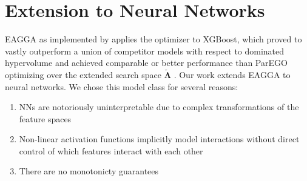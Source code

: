 \documentclass[twoside,11pt]{article}
\begin{document}
\section{Extension to Neural Networks}
EAGGA as implemented by \citet{EAGGA} applies the optimizer to XGBoost, which proved to vastly outperform a union of competitor models with respect to
dominated hypervolume and achieved comparable or better performance than ParEGO optimizing over the
extended search space $\check{\boldsymbol\Lambda}$ \citep[pp. 543-545]{EAGGA}.
Our work extends EAGGA to neural networks. We chose this model class for several reasons:
\begin{enumerate}[label*=\arabic*.]
  \item NNs are notoriously uninterpretable due to complex transformations of the feature spaces
  \item Non-linear activation functions implicitly model interactions without direct control of which features interact with each other
  \item There are no monotonicty guarantees
\end{enumerate}
\end{document}
